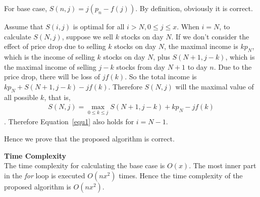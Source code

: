 \documentclass{article}
\newcommand{\Complexity}{\vspace{0.3cm} \noindent\textbf{Time Complexity} \\}
\begin{document}
For base case, $S(n, j) = j (p_n - f(j))$. By definition, obviously it is correct.

Assume that  $S(i, j)$ is optimal for all $i > N, 0 \leq j \leq x$. When $i = N$,
to calculate $S(N, j)$, suppose we sell $k$ stocks on day $N$. If we don't consider
the effect of price drop due to selling $k$ stocks on day $N$, the maximal income is
$k p_N$, which is the income of selling $k$ stocks on day $N$, plus $S(N+1, j-k)$, which is the
maximal income of selling $j-k$ stocks from day $N+1$ to day $n$. Due to the price drop, there will
be loss of $j f(k)$. So the total income is $k p_N + S(N+1, j-k) - jf(k)$. Therefore $S(N, j)$ will
the maximal value of all possible $k$, that is,
\begin{align}
  S(N, j) = \max_{0 \leq k \leq j} S(N+1, j-k) + k p_N - jf(k)
\end{align}
. Therefore Equation~\ref{equ1} also holds for $i = N-1$.

Hence we prove that the proposed algorithm is correct.


\Complexity
The time complexity for calculating the base case is $O(x)$. The most inner part in the \textit{for}
loop is executed $O(nx^2)$ times. Hence the time complexity of the proposed algorithm is $O(nx^2)$.
\end{document}
